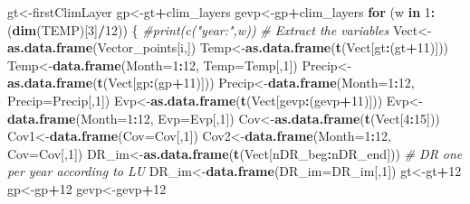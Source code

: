 \documentclass[
  10pt,
  b5paper,
]{book}
\newenvironment{Shaded}{\begin{snugshade}}{\end{snugshade}}
\newcommand{\CommentTok}[1]{\textcolor[rgb]{0.56,0.35,0.01}{\textit{#1}}}
\newcommand{\ControlFlowTok}[1]{\textcolor[rgb]{0.13,0.29,0.53}{\textbf{#1}}}
\newcommand{\DataTypeTok}[1]{\textcolor[rgb]{0.13,0.29,0.53}{#1}}
\newcommand{\DecValTok}[1]{\textcolor[rgb]{0.00,0.00,0.81}{#1}}
\newcommand{\KeywordTok}[1]{\textcolor[rgb]{0.13,0.29,0.53}{\textbf{#1}}}
\newcommand{\NormalTok}[1]{#1}
\newcommand{\OperatorTok}[1]{\textcolor[rgb]{0.81,0.36,0.00}{\textbf{#1}}}
\begin{document}
\begin{Shaded}
\begin{Highlighting}[]
\NormalTok{gt<-firstClimLayer}
\NormalTok{gp<-gt}\OperatorTok{+}\NormalTok{clim_layers}
\NormalTok{gevp<-gp}\OperatorTok{+}\NormalTok{clim_layers}
\ControlFlowTok{for}\NormalTok{ (w }\ControlFlowTok{in} \DecValTok{1}\OperatorTok{:}\NormalTok{(}\KeywordTok{dim}\NormalTok{(TEMP)[}\DecValTok{3}\NormalTok{]}\OperatorTok{/}\DecValTok{12}\NormalTok{)) \{}
\CommentTok{#print(c("year:",w))}
\CommentTok{# Extract the variables }
\NormalTok{Vect<-}\KeywordTok{as.data.frame}\NormalTok{(Vector_points[i,])}
\NormalTok{Temp<-}\KeywordTok{as.data.frame}\NormalTok{(}\KeywordTok{t}\NormalTok{(Vect[gt}\OperatorTok{:}\NormalTok{(gt}\OperatorTok{+}\DecValTok{11}\NormalTok{)]))}
\NormalTok{Temp<-}\KeywordTok{data.frame}\NormalTok{(}\DataTypeTok{Month=}\DecValTok{1}\OperatorTok{:}\DecValTok{12}\NormalTok{, }\DataTypeTok{Temp=}\NormalTok{Temp[,}\DecValTok{1}\NormalTok{])}
\NormalTok{Precip<-}\KeywordTok{as.data.frame}\NormalTok{(}\KeywordTok{t}\NormalTok{(Vect[gp}\OperatorTok{:}\NormalTok{(gp}\OperatorTok{+}\DecValTok{11}\NormalTok{)]))}
\NormalTok{Precip<-}\KeywordTok{data.frame}\NormalTok{(}\DataTypeTok{Month=}\DecValTok{1}\OperatorTok{:}\DecValTok{12}\NormalTok{, }\DataTypeTok{Precip=}\NormalTok{Precip[,}\DecValTok{1}\NormalTok{])}
\NormalTok{Evp<-}\KeywordTok{as.data.frame}\NormalTok{(}\KeywordTok{t}\NormalTok{(Vect[gevp}\OperatorTok{:}\NormalTok{(gevp}\OperatorTok{+}\DecValTok{11}\NormalTok{)]))}
\NormalTok{Evp<-}\KeywordTok{data.frame}\NormalTok{(}\DataTypeTok{Month=}\DecValTok{1}\OperatorTok{:}\DecValTok{12}\NormalTok{, }\DataTypeTok{Evp=}\NormalTok{Evp[,}\DecValTok{1}\NormalTok{])}
\NormalTok{Cov<-}\KeywordTok{as.data.frame}\NormalTok{(}\KeywordTok{t}\NormalTok{(Vect[}\DecValTok{4}\OperatorTok{:}\DecValTok{15}\NormalTok{]))}
\NormalTok{Cov1<-}\KeywordTok{data.frame}\NormalTok{(}\DataTypeTok{Cov=}\NormalTok{Cov[,}\DecValTok{1}\NormalTok{])}
\NormalTok{Cov2<-}\KeywordTok{data.frame}\NormalTok{(}\DataTypeTok{Month=}\DecValTok{1}\OperatorTok{:}\DecValTok{12}\NormalTok{, }\DataTypeTok{Cov=}\NormalTok{Cov[,}\DecValTok{1}\NormalTok{])}
\NormalTok{DR_im<-}\KeywordTok{as.data.frame}\NormalTok{(}\KeywordTok{t}\NormalTok{(Vect[nDR_beg}\OperatorTok{:}\NormalTok{nDR_end])) }\CommentTok{# DR one per year according to LU}
\NormalTok{DR_im<-}\KeywordTok{data.frame}\NormalTok{(}\DataTypeTok{DR_im=}\NormalTok{DR_im[,}\DecValTok{1}\NormalTok{])}
\NormalTok{gt<-gt}\OperatorTok{+}\DecValTok{12}
\NormalTok{gp<-gp}\OperatorTok{+}\DecValTok{12}
\NormalTok{gevp<-gevp}\OperatorTok{+}\DecValTok{12}
\end{Highlighting}
\end{Shaded}
\end{document}

